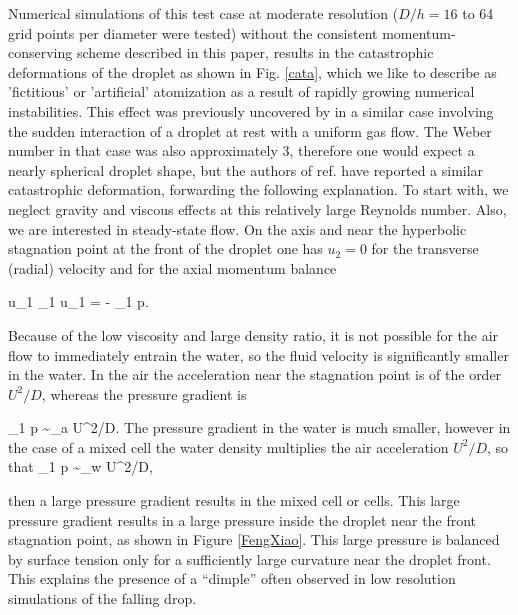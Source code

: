 Numerical simulations of this test case at moderate resolution ($D/h=16$ to 64 grid points per diameter were tested) without the consistent momentum-conserving scheme described in this paper, results in the catastrophic deformations of the droplet as shown in Fig. \ref{cata}, which we like to describe as 'fictitious' or 'artificial' atomization as a result of rapidly growing numerical instabilities. This effect was previously uncovered by \cite{Xiao:2014vs} in a similar case involving the sudden interaction of a droplet at rest with a uniform gas flow. The Weber number in that case was also approximately 3, therefore one would expect a nearly spherical droplet shape, but the authors of ref. \cite{Xiao:2014vs} have reported a similar catastrophic deformation, forwarding the following explanation. To start with, we neglect gravity and viscous effects at this relatively large Reynolds number. Also, we are interested in steady-state flow. On the axis and near the hyperbolic stagnation point at the front of the droplet one has $u_2=0$ for the transverse (radial) velocity and for the axial momentum balance

\be
u_1 \partial_1 u_1 = -  \rho \partial_1 p.
\nd

Because of the low viscosity and large density ratio, it is not possible for the air flow to immediately entrain the water, so the fluid velocity is significantly smaller in the water. In the air the acceleration near the stagnation point is of the order $U^2/D$, whereas the pressure gradient is

\be
\partial_1 p \sim \rho_{a} U^2/D.
\nd
The pressure gradient in the water is much smaller, however in the case of a mixed cell the water density multiplies the air acceleration $U^2/D$, so that
\be
\partial_1 p \sim \rho_{w} U^2/D,
\nd

then a large pressure gradient results in the mixed cell or cells. This large pressure gradient results in a large pressure inside the droplet near the front stagnation point, as shown in Figure \ref{FengXiao}. This large pressure is balanced by surface tension only for a sufficiently large curvature near the droplet front. This explains the presence of a ``dimple'' often observed in low resolution simulations of the falling drop. 

